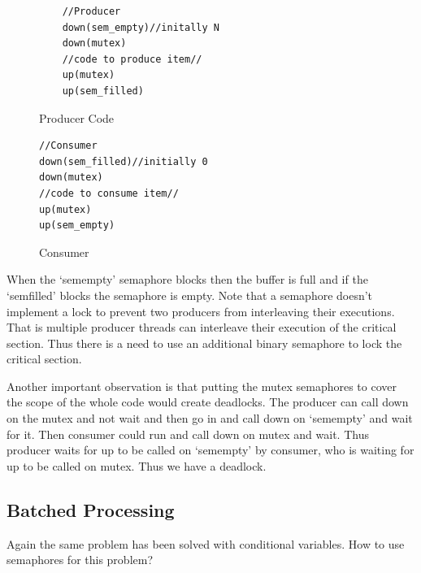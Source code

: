 \documentclass[12pt]{article}
\begin{document}
\begin{figure}[H]
    \begin{minipage}{.5\textwidth}
    \begin{tcolorbox}[colback=red!5!white,colframe=red!75!black]
    \begin{verbatim}
    //Producer 
    down(sem_empty)//initally N
    down(mutex)
    //code to produce item//
    up(mutex)
    up(sem_filled)
    \end{verbatim}
    \end{tcolorbox}
    \caption{Producer Code}
    \end{minipage}
    \hspace{0.05\textwidth}
    \begin{minipage}{.5\textwidth}
    \begin{tcolorbox}[colback=blue!5!white,colframe=blue!75!black]
    \begin{verbatim}
//Consumer
down(sem_filled)//initially 0
down(mutex)
//code to consume item//
up(mutex)
up(sem_empty)
    \end{verbatim}
    \end{tcolorbox}
    \caption{Consumer}
    \end{minipage}
    \end{figure}    





When the `semempty' semaphore blocks then the buffer is full and if the `semfilled' blocks the semaphore is empty. 
Note that a semaphore doesn't implement a lock to prevent two producers from interleaving their executions. That is multiple producer threads can interleave their execution of the critical section. Thus there is a need to 
use an additional binary semaphore to lock the critical section. 


Another important observation is that putting the mutex semaphores to cover the scope of the whole code would create deadlocks. The producer can call down on the mutex and not wait and then go in and call down on `semempty' and wait for it. Then consumer could run and call down on mutex and wait. Thus producer waits for up to be called on `semempty' by consumer, who is waiting for up to be called on mutex. Thus we have a deadlock. 
\subsection*{Batched Processing}
Again the same problem has been solved with conditional variables. How to use semaphores for this problem?
\end{document}
